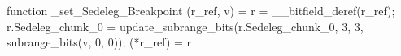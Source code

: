 function _set_Sedeleg_Breakpoint (r_ref, v) = {
    r = __bitfield_deref(r_ref);
    r.Sedeleg_chunk_0 = update_subrange_bits(r.Sedeleg_chunk_0, 3, 3, subrange_bits(v, 0, 0));
    (*r_ref) = r
}

